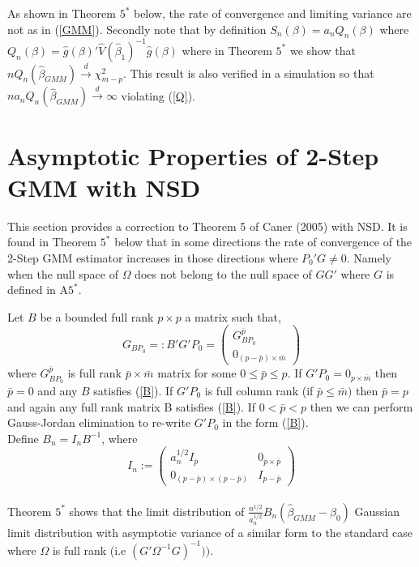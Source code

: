 \documentclass[11pt, fleqn]{article}
\begin{document}
As shown in Theorem $5^*$ below, the rate of convergence and limiting variance are not as in (\ref{GMM}). Secondly note that by definition $S_n(\beta)=a_nQ_n(\beta)$ where $Q_n(\beta)=\hat{g}(\beta)'\hat{V}(\hat{\beta}_1)^{-1}\hat{g}(\beta)$ where in Theorem $5^*$ we show   that $nQ_n(\hat{\beta}_{GMM})\overset{d}{\rightarrow} \chi^2_{m-p}$. This result is also  verified  in a simulation so that $na_nQ_n(\hat{\beta}_{GMM})\overset{d}{\rightarrow} \infty$ violating (\ref{Q}).


\section{Asymptotic Properties of 2-Step GMM with NSD}

This section provides a correction to Theorem 5 of Caner (2005) with NSD.
 It is found in Theorem $5^*$ below that in some directions the rate of convergence of the 2-Step GMM estimator   increases in those directions  where $P_0'G\neq 0$. Namely when the null space of $\Omega$ does not belong to the null space of $GG'$ where $G$ is defined in  A$5^*$.


Let $B$ be  a bounded full rank $p\times p$ a matrix such that,
\begin{equation}\label{B} G_{BP_0}=:B'G'P_0=\left(\begin{array}{c} G_{BP_0}^{\bar{p}} \\ 0_{(p-\bar{p})\times \bar{m}}\end{array}\right)\end{equation}
where $G_{BP_0}^{\bar{p}}$ is  full rank $\bar{p}\times \bar{m}$ matrix for some $0\leq \bar{p}\leq p$. If $G'P_0=0_{p\times \bar{m}}$ then $\bar{p}=0$ and any $B$ satisfies (\ref{B}). If $G'P_0$ is full column rank  (if $\bar{p}\leq\bar{m})$ then $\bar{p}=p$ and again any full rank matrix B satisfies (\ref{B}). If $0<\bar{p}<p$ then we can perform Gauss-Jordan elimination to re-write $G'P_0$ in the form (\ref{B}).\\

Define $B_n=I_nB^{-1}$, where \begin{equation}I_n:=\left(\begin{array}{cc} a_n^{1/2}I_{\bar{p}} & 0_{\bar{p}\times \bar{p}}\\ 0_{(p-\bar{p})\times (p-\bar{p})} & I_{p-\bar{p}}\end{array}\right) \end{equation}  
\\
Theorem $5^*$ shows that the limit distribution of $\frac{n^{1/2}}{a_n^{1/2}}B_n(\hat{\beta}_{GMM}-\beta_0)$    Gaussian limit distribution  with asymptotic variance of a similar form to the standard  case where $\Omega$ is full rank (i.e $(G'\Omega^{-1}G)^{-1}))$.  \newline
\end{document}
